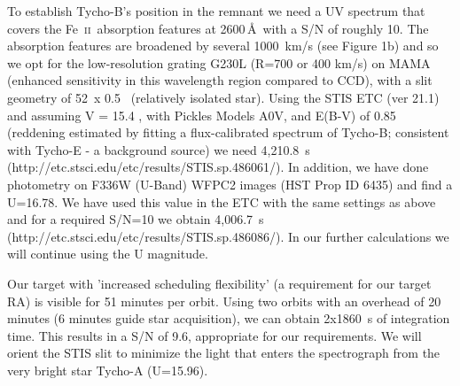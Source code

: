 \documentclass[12pt]{article}
\newcommand{\feii}{Fe~\textsc{ii}}
\begin{document}
To establish Tycho-B's position in the remnant we need a UV spectrum that covers the \feii\ absorption features at 2600\,\AA\ with a S/N of roughly 10. The absorption features are broadened by several 1000~km/s (see Figure 1b) and so we opt for the low-resolution grating G230L (R=700 or 400 km/s) on MAMA (enhanced sensitivity in this wavelength region compared to CCD), with a slit geometry of 52\arcsec\ x 0.5 \arcsec\ (relatively isolated star). Using the STIS ETC (ver 21.1) and assuming V = 15.4 \citep{2004Natur.431.1069R}, with Pickles Models A0V, and E(B-V) of 0.85 (reddening estimated by fitting a flux-calibrated spectrum of Tycho-B; consistent with Tycho-E - a background source) we need  4,210.8~s (http://etc.stsci.edu/etc/results/STIS.sp.486061/). 
In addition, we have done photometry on F336W (U-Band) WFPC2 images (HST Prop ID 6435) and find a U=16.78. We have used this value in the ETC with the same settings as above and for a required S/N=10 we obtain 4,006.7~s (http://etc.stsci.edu/etc/results/STIS.sp.486086/). In our further calculations we will continue using the U magnitude.


Our target with 'increased scheduling flexibility' (a requirement for our target RA) is visible for 51 minutes per orbit. Using two orbits with an overhead of 20 minutes (6 minutes guide star acquisition), we can obtain 2x1860~s of integration time. This results in a S/N of  9.6, appropriate for our requirements. We will orient the STIS slit to minimize the light that enters the spectrograph from the very bright star Tycho-A (U=15.96). 



%
%
\specialreq             %


%
%
\coordinatedobs          %


%
%
\duplications           %
\end{document}
